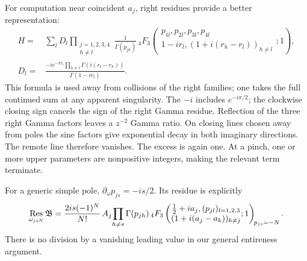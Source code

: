 \documentclass[11pt,a4paper]{article}
\newcommand{\B}{\mathfrak B}
\begin{document}
For computation near coincident \(a_j\), right residues provide
a better representation:
\begin{align}
H={}&\sum_l D_l
\prod_{\substack{j=1,2,3,4\\h\ne l}}\frac1{\Gamma(p_{jh})}\,
{}_4F_3\left(\begin{matrix}p_{1l},p_{2l},p_{3l},p_{4l}\\
1-ir_l,(1+i(r_h-r_l))_{h\ne l}
\end{matrix};1\right),\label{eq:right}\\
D_l={}&\frac{-i e^{-\pi r_l}
\prod_{h\ne l}\Gamma(i(r_l-r_h))}{\Gamma(1-ir_l)} .
\end{align}
This formula is used away from collisions of the right families;
one takes the full continued sum at any apparent singularity.
The \(-i\) includes \(e^{-i\pi/2}\); the clockwise closing sign
cancels the sign of the right Gamma residue.
Reflection of the three right Gamma factors leaves a \(z^{-2}\)
Gamma ratio. On closing lines chosen away from poles the sine
factors give exponential decay in both imaginary directions.
The remote line therefore vanishes. The excess is again one.
At a pinch, one or more upper parameters are nonpositive integers,
making the relevant term terminate.

For a generic simple pole, \(\partial_\omega p_{js}=-is/2\).
Its residue is explicitly
\begin{equation}
\mathop{\rm Res}_{\omega_{jsN}}\B
=\frac{2is(-1)^N}{N!}\,
 A_j\!\prod_{h\ne s}\Gamma(p_{jh})\,
{}_4F_3\left(\begin{matrix}\tfrac12+ia_j,(p_{jl})_{l=1,2,3}\\
(1+i(a_j-a_k))_{k\ne j}\end{matrix};1\right)_{\!p_{js}=-N}.
\label{eq:residue}
\end{equation}
There is no division by a vanishing leading value in our general
entireness argument.
\end{document}
